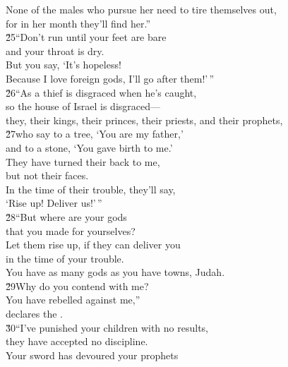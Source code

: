 \begin{poetry}
\poeml None of the males who pursue her need to tire themselves out, \\
\poemll    for in her month they'll find her.'' \\
\poeml \v{25}``Don't run until your feet are bare \\
\poemll    and your throat is dry. \\
\poeml But you say, `It's hopeless! \\
\poemll    Because I love foreign gods, I'll go after them!'\,'' \\
\poeml \v{26}``As a thief is disgraced when he's caught, \\
\poemll    so the house of Israel is disgraced--- \\
\poemlll       they, their kings, their princes, their priests, and their prophets, \\
\poeml \v{27}who say to a tree, `You are my father,' \\
\poemll    and to a stone, `You gave birth to me.' \\
\poeml They have turned their back to me, \\
\poemll    but not their faces. \\
\poeml In the time of their trouble, they'll say, \\
\poemll    `Rise up! Deliver us!'\,'' \\
\poeml \v{28}``But where are your gods \\
\poemll    that you made for yourselves? \\
\poeml Let them rise up, if they can deliver you \\
\poemll    in the time of your trouble. \\
\poemlll       You have as many gods as you have towns, Judah. \\
\poeml \v{29}Why do you contend with me? \\
\poemll    You have rebelled against me,'' \\
\poemlll       declares the . \\
\poeml \v{30}``I've punished your children with no results, \\
\poemll    they have accepted no discipline. \\
\poeml Your sword has devoured your prophets \\

\end{poetry}

